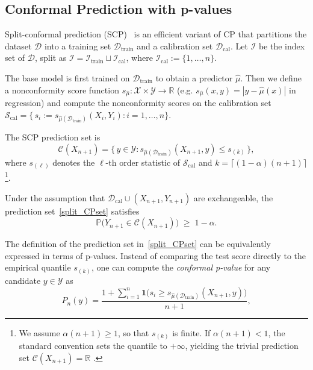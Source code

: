 \documentclass{article}
\theoremstyle{plain}
\theoremstyle{definition}
\theoremstyle{remark}
\begin{document}
\subsection{Conformal Prediction with p-values}

Split-conformal prediction (SCP)~\citep{papadopoulos2002inductive} is an efficient variant of CP that partitions the dataset \(\mathcal{D}\) into a training set \(\mathcal{D}_{\text{train}}\) and a calibration set \(\mathcal{D}_{\text{cal}}\). Let \(\mathcal{I}\) be the index set of \(\mathcal{D}\), split as \(\mathcal{I} = \mathcal{I}_{\text{train}} \sqcup \mathcal{I}_{\text{cal}}\), where \(\mathcal{I}_{\text{cal}} := \{1,\dots,n\}\).

The base model is first trained on \(\mathcal{D}_{\text{train}}\) to obtain a predictor \(\hat{\mu}\). Then we define a nonconformity score function \(s_{\hat{\mu}}: \mathcal{X} \times \mathcal{Y} \to \mathbb{R}\)  (e.g. \(s_{\hat{\mu}}(x,y) = |y - \hat{\mu}(x)|\) in regression) and compute the nonconformity scores on the calibration set $\mathcal{S}_{\text{cal}} = \{\, s_i := s_{\hat{\mu}(\mathcal{D}_{\text{train}})}(X_i, Y_i) : i =1,\dots,n\}$.

The SCP prediction set is
\begin{equation}
\label{split_CPset}
\mathcal{C}(X_{n+1})
= \bigl\{\, y \in \mathcal{Y} : s_{\hat{\mu}(\mathcal{D}_{\text{train}})}(X_{n+1}, y) \le s_{(k)} \,\bigr\},
\end{equation}
where \(s_{(\ell)}\) denotes the \(\ell\)-th order statistic of $\mathcal{S}_{\text{cal}}$ and \(k = \lceil (1-\alpha)(n+1) \rceil\)\footnote{We assume \(\alpha(n+1)\ge 1\),  so that $s_{(k)}$ is finite. If \(\alpha(n+1)<1\), the standard convention sets the quantile to \(+\infty\), yielding the trivial prediction set $\mathcal{C}(X_{n+1})=\mathbb 
R$ \citep{angelopoulos2023conformal}.}.

Under the assumption that \(\mathcal{D}_{\text{cal}} \cup (X_{n+1}, Y_{n+1})\) are exchangeable, the prediction set~\eqref{split_CPset} satisfies
\begin{equation}
\label{valid_coverage}
\mathbb{P}\big( Y_{n+1} \in \mathcal{C}(X_{n+1}) \big) \;\ge\; 1-\alpha.
\end{equation}

The definition of the prediction set in~\eqref{split_CPset} can be equivalently expressed in terms of 
p-values. Instead of comparing the test score directly to the empirical quantile $s_{(k)}$, 
one can compute the \textit{conformal p-value} for any candidate  $y \in \mathcal{Y}$ as
\begin{equation}
\label{pval_CP}
    P_{n}(y) = \frac{1 + \sum_{i=1}^n \mathbf{1}\!\big(s_i \geq s_{\hat{\mu}(\mathcal{D}_{\text{train}})}(X_{n+1}, y)\big)}{n+1},
\end{equation}
\end{document}

